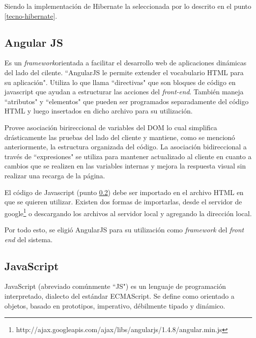         Siendo la implementación de Hibernate la seleccionada por lo descrito en el punto \ref{tecno-hibernate}.
        
        \subsection{Angular JS}
        \label{tecno-angular}
        
        Es un \textit{framework}orientada a facilitar el desarrollo web de aplicaciones dinámicas del lado del cilente. ``AngularJS le permite extender el vocabulario HTML para su aplicación"\cite{ANGULARJS-angularjs}. Utiliza lo que llama ``directivas" que son bloques de código en javascript que ayudan a estructurar las acciones del \textit{front-end}. También maneja ``atributos" y ``elementos" que pueden ser programados separadamente del código HTML y luego insertados en dicho archivo para su utilización.
        
        Provee asociación birireccional de variables del DOM lo cual simplifica drásticamente las pruebas del lado del cliente y mantiene, como se mencionó anteriormente, la estructura organizada del código. La asociación bidireccional a través de ``expresiones" se utiliza para mantener actualizado al cliente en cuanto a cambios que se realizen en las variables internas y mejora la respuesta visual sin realizar una recarga de la página.
        
        El código de Javascript (punto \ref{tecno-javascript}) debe ser importado en el archivo HTML en que se quieren utilizar. Existen dos formas de importarlas, desde el servidor de google\footnote{http://ajax.googleapis.com/ajax/libs/angularjs/1.4.8/angular.min.js} o descargando los archivos al servidor local y agregando la dirección local.
        
        Por todo esto, se eligió AngularJS para su utilización como \textit{framework} del \textit{front end} del sistema.
        
        \subsection{JavaScript}
        \label{tecno-javascript}
        
        JavaScript (abreviado comúnmente ``JS") es un lenguaje de programación interpretado, dialecto del estándar ECMAScript. Se define como orientado a objetos, basado en prototipos, imperativo, débilmente tipado y dinámico\cite{JAVASCRIPT-wiki}.
        
